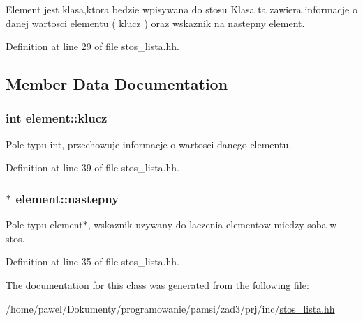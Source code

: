 Element jest klasa,ktora bedzie wpisywana do stosu Klasa ta zawiera informacje o danej wartosci elementu ( klucz ) oraz wskaznik na nastepny element. 

Definition at line 29 of file stos\-\_\-lista.\-hh.



\subsection{Member Data Documentation}
\hypertarget{classelement_a112279ccab2f4e22485125be5bda7b75}{
\subsubsection[{klucz}]{\setlength{\rightskip}{0pt plus 5cm}int element\-::klucz}}\label{classelement_a112279ccab2f4e22485125be5bda7b75}


Pole typu int, przechowuje informacje o wartosci danego elementu. 



Definition at line 39 of file stos\-\_\-lista.\-hh.

\hypertarget{classelement_ab6df52b0e5cfa7c4998a2ab74a8ef53e}{
\subsubsection[{nastepny}]{$\ast$ element\-::nastepny}}\label{classelement_ab6df52b0e5cfa7c4998a2ab74a8ef53e}


Pole typu element$\ast$, wskaznik uzywany do laczenia elementow miedzy soba w stos. 



Definition at line 35 of file stos\-\_\-lista.\-hh.



The documentation for this class was generated from the following file\-:\begin{DoxyCompactItemize}
\item 
/home/pawel/\-Dokumenty/programowanie/pamsi/zad3/prj/inc/\hyperlink{stos__lista_8hh}{stos\-\_\-lista.\-hh}\end{DoxyCompactItemize}
